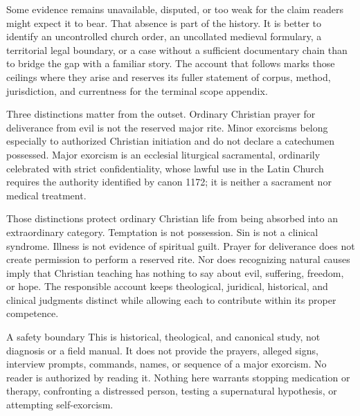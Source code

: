 Some evidence remains unavailable, disputed, or too weak for the claim readers
might expect it to bear. That absence is part of the history. It is better to
identify an uncontrolled church order, an uncollated medieval formulary, a
territorial legal boundary, or a case without a sufficient documentary chain
than to bridge the gap with a familiar story. The account that follows marks
those ceilings where they arise and reserves its fuller statement of corpus,
method, jurisdiction, and currentness for the terminal scope appendix.

Three distinctions matter from the outset. Ordinary Christian prayer for
deliverance from evil is not the reserved major rite. Minor exorcisms belong
especially to authorized Christian initiation and do not declare a catechumen
possessed. Major exorcism is an ecclesial liturgical sacramental, ordinarily
celebrated with strict confidentiality, whose lawful use in the Latin Church
requires the authority identified by canon 1172; it is neither a sacrament nor
medical treatment.

Those distinctions protect ordinary Christian life from being absorbed into
an extraordinary category. Temptation is not possession. Sin is not a
clinical syndrome. Illness is not evidence of spiritual guilt. Prayer for
deliverance does not create permission to perform a reserved rite. Nor does
recognizing natural causes imply that Christian teaching has nothing to say
about evil, suffering, freedom, or hope. The responsible account keeps
theological, juridical, historical, and clinical judgments distinct while
allowing each to contribute within its proper competence.

\begin{studybox}{A safety boundary}
This is historical, theological, and canonical study, not diagnosis or a field
manual. It does not provide the prayers, alleged signs, interview prompts,
commands, names, or sequence of a major exorcism. No reader is authorized by
reading it. Nothing here warrants stopping medication or therapy, confronting
a distressed person, testing a supernatural hypothesis, or attempting
self-exorcism.
\end{studybox}
